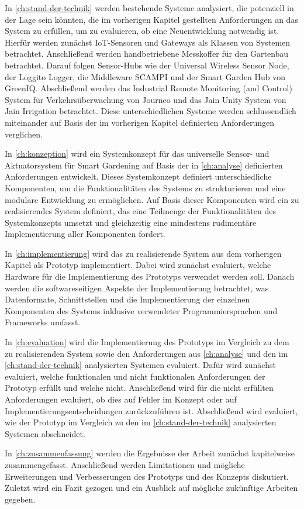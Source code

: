 In \cref{ch:stand-der-technik} werden bestehende Systeme analysiert, die potenziell in der Lage sein könnten, die im vorherigen Kapitel gestellten Anforderungen an das System zu erfüllen, um zu evaluieren, ob eine Neuentwicklung notwendig ist.
Hierfür werden zunächst IoT-Sensoren und Gateways als Klassen von Systemen betrachtet.
Anschließend werden handbetriebene Messkoffer für den Gartenbau betrachtet.
Darauf folgen Sensor-Hubs wie der Universal Wireless Sensor Node, der Loggito Logger, die Middleware SCAMPI und der Smart Garden Hub von GreenIQ.
Abschließend werden das Industrial Remote Monitoring (and Control) System für Verkehrsüberwachung von Journeo und das Jain Unity System von Jain Irrigation betrachtet.
Diese unterschiedlichen Systeme werden schlussendlich miteinander auf Basis der im vorherigen Kapitel definierten Anforderungen verglichen.

In \cref{ch:konzeption} wird ein Systemkonzept für das universelle Sensor- und Aktuatorsystem für Smart Gardening auf Basis der in \cref{ch:analyse} definierten Anforderungen entwickelt.
Dieses Systemkonzept definiert unterschiedliche Komponenten, um die Funktionalitäten des Systems zu strukturieren und eine modulare Entwicklung zu ermöglichen.
Auf Basis dieser Komponenten wird ein zu realisierendes System definiert, das eine Teilmenge der Funktionalitäten des Systemkonzepts umsetzt und gleichzeitig eine mindestens rudimentäre Implementierung aller Komponenten fordert.

In \cref{ch:implementierung} wird das zu realisierende System aus dem vorherigen Kapitel als Prototyp implementiert.
Dabei wird zunächst evaluiert, welche Hardware für die Implementierung des Prototyps verwendet werden soll.
Danach werden die softwareseitigen Aspekte der Implementierung betrachtet, was Datenformate, Schnittstellen und die Implementierung der einzelnen Komponenten des Systems inklusive verwendeter Programmiersprachen und Frameworks umfasst.

In \cref{ch:evaluation} wird die Implementierung des Prototyps im Vergleich zu dem zu realisierenden System sowie den Anforderungen aus \cref{ch:analyse} und den im \cref{ch:stand-der-technik} analysierten Systemen evaluiert.
Dafür wird zunächst evaluiert, welche funktionalen und nicht funktionalen Anforderungen der Prototyp erfüllt und welche nicht.
Anschließend wird für die nicht erfüllten Anforderungen evaluiert, ob dies auf Fehler im Konzept oder auf Implementierungsentscheidungen zurückzuführen ist.
Abschließend wird evaluiert, wie der Prototyp im Vergleich zu den im \cref{ch:stand-der-technik} analysierten Systemen abschneidet.

In \cref{ch:zusammenfassung} werden die Ergebnisse der Arbeit zunächst kapitelweise zusammengefasst.
Anschließend werden Limitationen und mögliche Erweiterungen und Verbesserungen des Prototyps und des Konzepts diskutiert.
Zuletzt wird ein Fazit gezogen und ein Ausblick auf mögliche zukünftige Arbeiten gegeben.